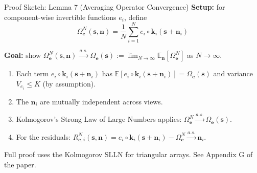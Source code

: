 \documentclass[aspectratio=169, 10pt]{beamer}
\begin{document}
\begin{frame}{Proof Sketch: Lemma 7 (Averaging Operator Convergence)}
  \textbf{Setup:} for component-wise invertible functions $e_i$, define
  \[
    \Omega^N_{\mathbf{e}}(\mathbf{s},\mathbf{n})
    = \frac{1}{N}\sum_{i=1}^N e_i \circ \mathbf{k}_i(\mathbf{s}+\mathbf{n}_i)
  \]

  \textbf{Goal:} show $\Omega^N_{\mathbf{e}}(\mathbf{s},\mathbf{n})
  \xrightarrow{\,a.s.\,} \Omega_{\mathbf{e}}(\mathbf{s})
  := \lim_{N\to\infty}\mathbb{E}_{\mathbf{n}}[\Omega^N_{\mathbf{e}}]$ as $N\to\infty$.

  \medskip
  \begin{enumerate}
    \item Each term $e_i\circ\mathbf{k}_i(\mathbf{s}+\mathbf{n}_i)$ has
          $\mathbb{E}[e_i\circ\mathbf{k}_i(\mathbf{s}+\mathbf{n}_i)] = \Omega_{\mathbf{e}}(\mathbf{s})$
          and variance $V_{e_i} \leq K$ (by assumption).
    \item The $\mathbf{n}_i$ are mutually independent across views.
    \item Kolmogorov's Strong Law of Large Numbers applies:
          $\Omega^N_{\mathbf{e}} \xrightarrow{a.s.} \Omega_{\mathbf{e}}(\mathbf{s})$.
    \item For the residuals: $R^N_{\mathbf{e},i}(\mathbf{s},\mathbf{n})
          = e_i\circ\mathbf{k}_i(\mathbf{s}+\mathbf{n}_i) - \Omega^N_{\mathbf{e}}
          \xrightarrow{a.s.} \mathbf{n}_i$.
  \end{enumerate}

  \medskip
  Full proof uses the Kolmogorov SLLN for triangular arrays.
  See Appendix G of the paper.
\end{frame}
\end{document}
